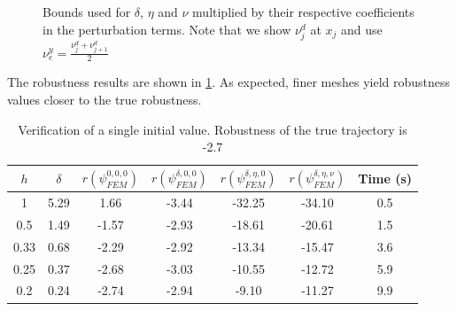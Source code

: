 \documentclass[oribibl]{llncs/llncs}
\begin{document}
\begin{figure}[!t]
    \centering 
        \hfill
        \hfill
    \caption{Bounds used for $\delta$, $\eta$ and $\nu$ multiplied by their
    respective coefficients in the perturbation terms. Note that we show $\nu^d_j$ at
    $x_j$ and use $\nu_e^y = \frac{\nu^d_j + \nu^d_{j+1}}{2}$}
    \label{fig:bounds}
\end{figure}

The robustness results are shown in \cref{tab:res_meshes}. As expected, finer meshes
yield robustness values closer to the true robustness.

\begin{table}
\centering
\begin{tabular}{|c|c|c|c|c|c|c|}
    \hline
    $h$ & $\delta$ & $r(\psi_{FEM}^{0, 0, 0})$ & $r(\psi_{FEM}^{\delta, 0, 0})$ &
    $r(\psi_{FEM}^{\delta, \eta, 0})$ & $r(\psi_{FEM}^{\delta, \eta,
\nu})$ & Time (s)  \\
    \hline
    1 & 5.29 & 1.66 & -3.44 & -32.25 & -34.10 & 0.5 \\
    0.5 & 1.49 & -1.57 & -2.93 & -18.61 & -20.61 & 1.5 \\
    0.33 & 0.68 & -2.29 & -2.92 & -13.34 & -15.47 & 3.6 \\
    0.25 & 0.37 & -2.68 & -3.03 & -10.55 & -12.72 & 5.9 \\
    0.2 & 0.24 & -2.74 & -2.94 & -9.10 & -11.27 & 9.9 \\
    \hline
\end{tabular}
\caption{Verification of a single initial value. Robustness of the true
trajectory is -2.7}
\label{tab:res_meshes}
\end{table}
\end{document}
